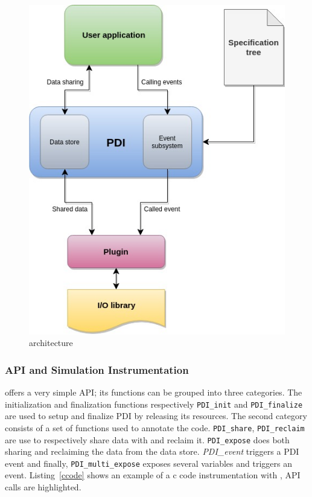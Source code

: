 \begin{figure}[tb]\centering
\includegraphics[scale=0.8]{figures/PDI_schema.jpg}
\caption{\pdi architecture}
\label{figpdiarchi}
\end{figure}

\subsubsection{\pdi API and Simulation Instrumentation}
\pdi offers a very simple API; its functions can be grouped into three categories. The initialization and finalization functions respectively \texttt{PDI\_init} and \texttt{PDI\_finalize} are used to setup and finalize PDI by releasing its resources. 
The second category consists of a set of functions used to annotate the code. \texttt{PDI\_share}, \texttt{PDI\_reclaim} are use to respectively share data with \pdi and reclaim it. \texttt{PDI\_expose} does both sharing and reclaiming the data from the data store. \textit{PDI\_event} triggers a PDI event and finally, \texttt{PDI\_multi\_expose} exposes several variables and triggers an event. Listing~\ref{ccode} shows an example of a c code instrumentation with \pdi, \pdi API calls are highlighted.

